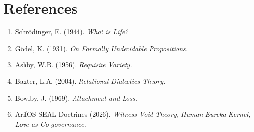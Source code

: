 \documentclass[11pt, a4paper]{article}
\begin{document}
\section*{References}
\begin{enumerate}
    \item Schrödinger, E. (1944). \textit{What is Life?}
    \item Gödel, K. (1931). \textit{On Formally Undecidable Propositions.}
    \item Ashby, W.R. (1956). \textit{Requisite Variety.}
    \item Baxter, L.A. (2004). \textit{Relational Dialectics Theory.}
    \item Bowlby, J. (1969). \textit{Attachment and Loss.}
    \item ArifOS SEAL Doctrines (2026). \textit{Witness-Void Theory, Human Eureka Kernel, Love as Co-governance.}
\end{enumerate}
\end{document}
